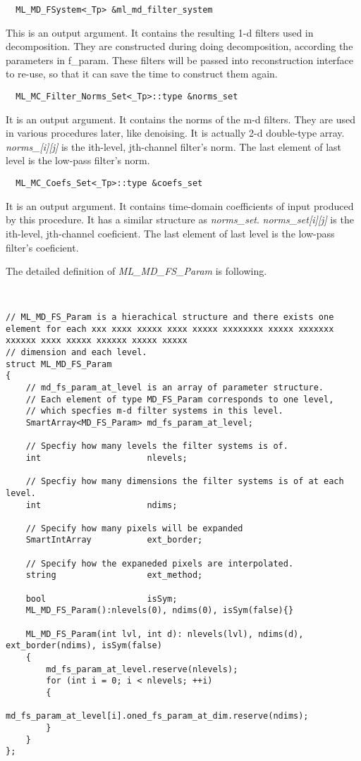 \documentclass[a4paper,5pt]{article}
\begin{document}
\begin{lstlisting}
  ML_MD_FSystem<_Tp> &ml_md_filter_system
\end{lstlisting}
  This is an output argument. It contains the resulting 1-d filters used in decomposition. They are constructed during doing decomposition, according the parameters in f\_param. These filters will be passed into reconstruction interface to re-use, so that it can save the time to construct them again.
  
\begin{lstlisting}
  ML_MC_Filter_Norms_Set<_Tp>::type &norms_set
\end{lstlisting}
  It is an output argument. It contains the norms of the m-d filters. They are used in various procedures later, like denoising. It is actually 2-d double-type array. \textit{norms\_[i][j]} is the ith-level, jth-channel filter's norm. The last element of last level is the low-pass filter's norm.
  
\begin{lstlisting}
  ML_MC_Coefs_Set<_Tp>::type &coefs_set
\end{lstlisting}
  It is an output argument. It contains time-domain coefficients of input produced by this procedure. It has a similar structure as \textit{norms\_set}. \textit{norms\_set[i][j]} is the ith-level, jth-channel coeficient. The last element of last level is the low-pass filter's coeficient.
  
  The detailed definition of \textit{ML\_MD\_FS\_Param} is following.
\begin{lstlisting}


// ML_MD_FS_Param is a hierachical structure and there exists one element for each xxx xxxx xxxxx xxxx xxxxx xxxxxxxx xxxxx xxxxxxx xxxxxx xxxx xxxxx xxxxxx xxxxx xxxxx
// dimension and each level.
struct ML_MD_FS_Param
{
	// md_fs_param_at_level is an array of parameter structure.
	// Each element of type MD_FS_Param corresponds to one level, 
	// which specfies m-d filter systems in this level.
	SmartArray<MD_FS_Param> md_fs_param_at_level;
	
	// Specfiy how many levels the filter systems is of.
	int 					nlevels;
	
	// Specfiy how many dimensions the filter systems is of at each level.
	int 					ndims;
	
	// Specify how many pixels will be expanded
	SmartIntArray			ext_border;
	
	// Specify how the expaneded pixels are interpolated.
	string					ext_method;
	
	bool 					isSym;
	ML_MD_FS_Param():nlevels(0), ndims(0), isSym(false){}

	ML_MD_FS_Param(int lvl, int d): nlevels(lvl), ndims(d), ext_border(ndims), isSym(false)
	{
		md_fs_param_at_level.reserve(nlevels);
		for (int i = 0; i < nlevels; ++i)
		{
			md_fs_param_at_level[i].oned_fs_param_at_dim.reserve(ndims);
		}
	}
};
\end{lstlisting}
\end{document}
